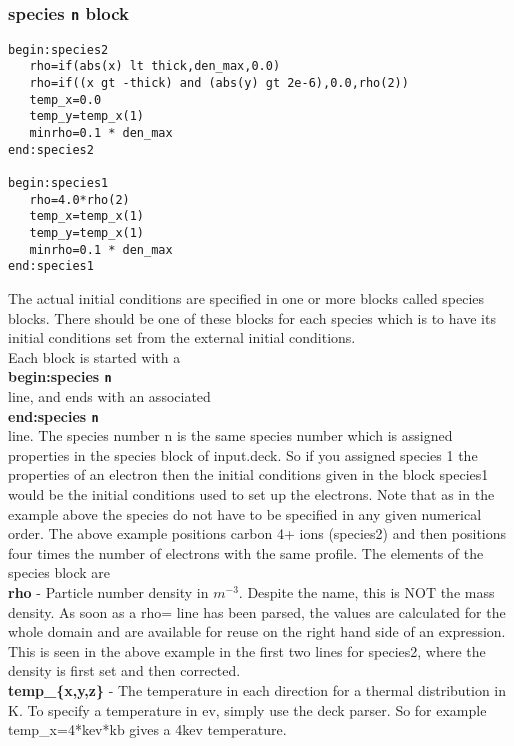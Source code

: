 \documentclass[12pt]{article}
\newcommand{\emphtext}{\color{warwickdark} \fontfamily{phv}\selectfont\Large\bf}
\newcommand{\boxverbatim}[1]{\begin{Verbatim}[obeytabs=true,frame=single,
  framerule=0.5mm,rulecolor=\color{warwickmid},label=#1]}
\newcommand{\inlinecode}[1]{{\color{warwickred} \bf\texttt{#1}}}
\newcommand{\inlineemph}[1]{{\color{warwicklight} \bf{#1}}}
\begin{document}
\subsubsection{\inlineemph{species\inlinecode{n}} block}
\boxverbatim{species{\it n} block}
begin:species2
   rho=if(abs(x) lt thick,den_max,0.0)
   rho=if((x gt -thick) and (abs(y) gt 2e-6),0.0,rho(2))
   temp_x=0.0
   temp_y=temp_x(1)
   minrho=0.1 * den_max
end:species2

begin:species1
   rho=4.0*rho(2)
   temp_x=temp_x(1)
   temp_y=temp_x(1)
   minrho=0.1 * den_max
end:species1
\end{Verbatim}

The actual initial conditions are specified in one or more blocks called
species blocks. There should be one of these blocks for each species which is
to have its initial conditions set from the external initial conditions.\\

Each block is started with a\\

{\emphtext begin:species\inlinecode{n}}\\

line, and ends with an associated \\

{\emphtext end:species\inlinecode{n}}\\

line. The species number n is the same species number which is assigned
properties in the species block of input.deck. So if you assigned species 1 the
properties of an electron then the initial conditions given in the block
species1 would be the initial conditions used to set up the electrons. Note
that as in the example above the species do not have to be specified in any
given numerical order. The above example positions carbon 4+ ions (species2)
and then positions four times the number of electrons with the same
profile. The elements of the species block are\\

{\emphtext rho} - Particle number density in $m^{-3}$. Despite the name, this
is NOT the mass density. As soon as a rho= line has been parsed, the values are
calculated for the whole domain and are available for reuse on the right hand
side of an expression. This is seen in the above example in the first two lines
for species2, where the density is first set and then corrected.\\

{\emphtext temp\_\{x,y,z\}} - The temperature in each direction for a thermal
distribution in K. To specify a temperature in ev, simply use the deck
parser. So for example temp\_x=4*kev*kb gives a 4kev temperature.\\
\end{document}
